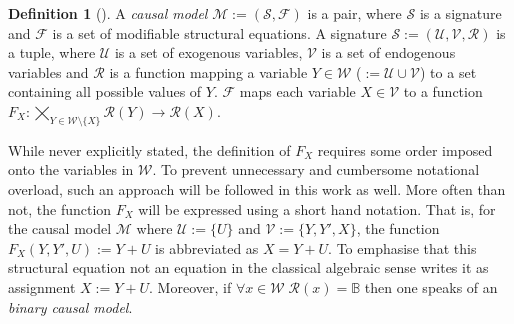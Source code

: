 \documentclass[11pt,a4paper]{book}
\theoremstyle{definition}
\newtheorem{definition}{Definition}[section]
\theoremstyle{definition}
\theoremstyle{definition}
\theoremstyle{remark}
\newcommand{\cmodel}{\mathcal{M}}
\newcommand{\csig}{\mathcal{S}}
\newcommand{\cfoos}{\mathcal{F}}
\newcommand{\crange}{\mathcal{R}}
\newcommand{\cvars}{\mathcal{W}}
\newcommand{\cenvars}{\mathcal{V}}
\newcommand{\cexvars}{\mathcal{U}}
\begin{document}
% 

\begin{definition}[\parencite{halpern2015cause}]
A \emph{causal model} $\cmodel:=(\csig, \cfoos)$ is a pair, where $\csig$ is a signature and $\cfoos$ is a set of modifiable structural equations.
A signature $\csig:=(\cexvars, \cenvars, \crange)$ is a tuple, where $\cexvars$ is a set of exogenous variables, $\cenvars$ is a set of endogenous variables and $\crange$ is a function mapping 
a variable $Y \in \cvars$ ($:=\cexvars \cup \cenvars$) to a set containing all possible values of $Y$. 
$\cfoos$ maps each variable $X\in \cenvars$ to a function $F_X:  \bigtimes_{Y \in \cvars\setminus \{X\}} \crange(Y) \to \crange(X)$.
\end{definition}

While never explicitly stated, the definition of $F_X$ requires some order imposed onto the variables in $\cvars$. To prevent unnecessary and cumbersome notational overload, such an approach will be followed in this work as well.
More often than not, the function $F_X$ will be expressed using a short hand notation. That is, for the causal model $\cmodel$ where $\cexvars := \{U\}$ and $\cenvars := \{Y,Y',X\}$, the function $F_{X}(Y,Y',U):=Y+U$ is abbreviated
as $X = Y+U$. To emphasise that this structural equation not an equation in the classical algebraic sense \parencite{Weslake2015partial} writes it as assignment $X := Y+U$.
Moreover, if $\forall x \in \cvars\; \crange(x)=\mathbb{B}$ then one speaks of an \emph{binary causal model}.
\end{document}
